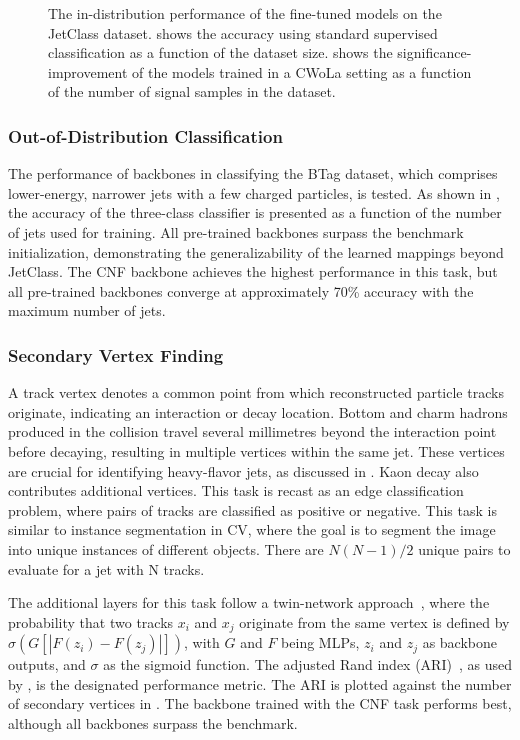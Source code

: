 \begin{figure}[h!]
\begin{subfigure}[b]{0.4\textwidth}
        \caption{}
        \label{fig:cwola}
    \end{subfigure}
    \caption{The in-distribution performance of the fine-tuned models on the JetClass dataset.  shows the accuracy using standard supervised classification as a function of the dataset size.  shows the significance-improvement of the models trained in a CWoLa setting as a function of the number of signal samples in the dataset.}
    \label{fig:plot_A}
\end{figure}

\subsubsection{Out-of-Distribution Classification}

The performance of backbones in classifying the BTag dataset, which comprises lower-energy, narrower jets with a few charged particles, is tested.
As shown in , the accuracy of the three-class classifier is presented as a function of the number of jets used for training.
All pre-trained backbones surpass the benchmark initialization, demonstrating the generalizability of the learned mappings beyond JetClass.
The CNF backbone achieves the highest performance in this task, but all pre-trained backbones converge at approximately 70\% accuracy with the maximum number of jets.

\subsubsection{Secondary Vertex Finding}

A track vertex denotes a common point from which reconstructed particle tracks originate, indicating an interaction or decay location.
Bottom and charm hadrons produced in the collision travel several millimetres beyond the interaction point before decaying, resulting in multiple vertices within the same jet.
These vertices are crucial for identifying heavy-flavor jets, as discussed in .
Kaon decay also contributes additional vertices.
This task is recast as an edge classification problem, where pairs of tracks are classified as positive or negative.
This task is similar to instance segmentation in CV, where the goal is to segment the image into unique instances of different objects.
There are $N(N-1)/2$ unique pairs to evaluate for a jet with N tracks.

The additional layers for this task follow a twin-network approach~\cite{siamese}, where the probability that two tracks $x_i$ and $x_j$ originate from the same vertex is defined by $\sigma\left(G\left[|F\left(z_i\right)-F\left(z_j\right)|\right]\right)$, with $G$ and $F$ being MLPs, $z_i$ and $z_j$ as backbone outputs, and $\sigma$ as the sigmoid function.
The adjusted Rand index (ARI)~\cite{ari}, as used by \textcite{SecondaryVertexFinding}, is the designated performance metric.
The ARI is plotted against the number of secondary vertices in .
The backbone trained with the CNF task performs best, although all backbones surpass the benchmark.

